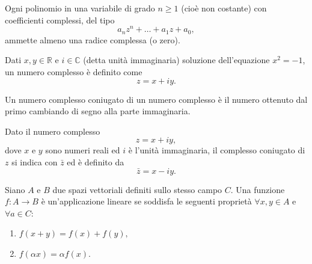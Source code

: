 \begin{theorem}\label{th:fondamentale_algebra}
   Ogni polinomio in una variabile di grado $n\geq 1$ (cioè non costante) con coefficienti complessi, del tipo
    \begin{equation*}
        a_{n}z^{n}+\ldots +a_{1}z+a_{0},
    \end{equation*}
    ammette almeno una radice complessa (o zero). 
\end{theorem}
\begin{definition}
    Dati $x,y\in\mathbb R$ e $i\in\mathbb C$ (detta unità immaginaria) soluzione dell'equazione $x^2=-1$, un numero complesso è definito come
    \begin{equation*}
        z=x+iy.
    \end{equation*}
\end{definition}
Un numero complesso coniugato di un numero complesso è il numero ottenuto dal primo cambiando di segno alla parte immaginaria.
\begin{definition}\label{def:complesso_coniugato}
    Dato il numero complesso
    \begin{equation*}
        z = x + i y,
    \end{equation*}
    dove $x$ e $y$ sono numeri reali ed $i$ è l'unità immaginaria, il complesso coniugato di $z$ si indica con $\bar {z}$ ed è definito da
    \begin{equation*}
        \bar {z}=x-iy.
    \end{equation*}
\end{definition}

\begin{definition}\label{def:applicazione_lineare}
	Siano $A$ e $B$ due spazi vettoriali definiti sullo stesso campo $C$. Una funzione $f:A\rightarrow B$ è un'\gls{applicazione lineare} se soddisfa le seguenti proprietà $\forall x,y\in A$ e $\forall a\in C$:
	\begin{enumerate}
		\item $f(x+y)=f(x)+f(y),$
		\item $f(\alpha x)=\alpha f(x)$.
	\end{enumerate}
\end{definition}